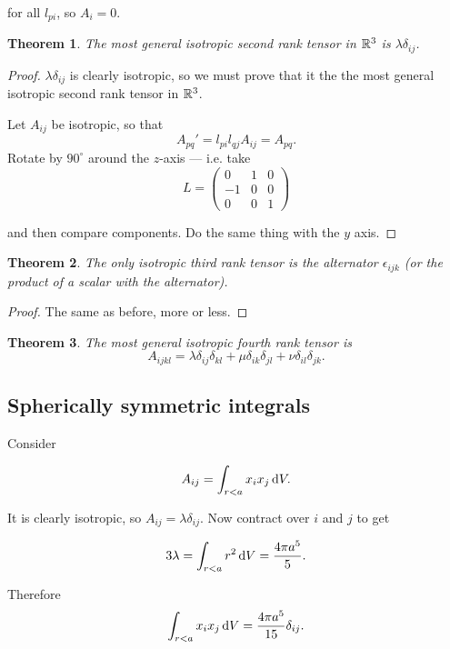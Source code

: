 \documentclass{notes}
\theoremstyle{plain}
\newtheorem{theorem}{Theorem}[chapter]
\begin{document}
for all $l_{pi}$, so $A_i = 0$.

\begin{theorem}
The most general isotropic second rank tensor in $\mathbb{R}^3$ is $\lambda
\delta_{ij}$.
\end{theorem}

\begin{proof}
$\lambda \delta_{ij}$ is clearly isotropic, so we must prove that it
the the most general isotropic second rank tensor in $\mathbb{R}^3$.

Let $A_{ij}$ be isotropic, so that
\[
A_{pq}' = l_{pi} l_{qj} A_{ij} = A_{pq}.
\]
Rotate by $90^\circ$ around the $z$-axis --- i.e. take
\[
L = \begin{pmatrix}
0 & 1 & 0 \\ -1 & 0 & 0 \\ 0 & 0 & 1
\end{pmatrix}
\]

and then compare components.  Do the same thing with the $y$ axis.
\end{proof}

\begin{theorem}
The only isotropic third rank tensor is the alternator
$\epsilon_{ijk}$  (or the product of a scalar with the alternator).
\end{theorem}

\begin{proof}
The same as before, more or less.
\end{proof}

\begin{theorem}
The most general isotropic fourth rank tensor is
\[
A_{ijkl} = \lambda \delta_{ij} \delta_{kl} + \mu \delta_{ik}
\delta_{jl} + \nu \delta_{il} \delta_{jk}.
\]
\end{theorem}

\subsection{Spherically symmetric integrals}

Consider

\[
A_{ij} = \int_{r < a} x_i x_j\, \mathrm{d} V.
\]

It is clearly isotropic, so $A_{ij} = \lambda \delta_{ij}$.  Now
contract over $i$ and $j$ to get

\[
3 \lambda = \int_{r < a} r^2\, \mathrm{d} V = \frac{4 \pi a^5}{5}.
\]

Therefore
\[
\int_{r < a} x_i x_j\, \mathrm{d} V = \frac{4 \pi a^5}{15} \delta_{ij}.
\]
\end{document}
